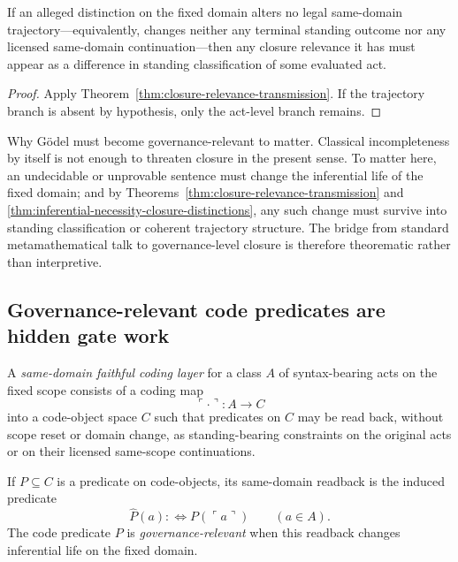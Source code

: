 \begin{corollary}
If an alleged distinction on the fixed domain alters no legal same-domain trajectory---equivalently, changes neither any terminal standing outcome nor any licensed same-domain continuation---then any closure relevance it has must appear as a difference in standing classification of some evaluated act.
\end{corollary}

\begin{proof}
Apply Theorem~\ref{thm:closure-relevance-transmission}. If the trajectory branch is absent by hypothesis, only the act-level branch remains.
\end{proof}

\begin{remark}
\label{rem:godel-governance-relevance}
Why G\"odel must become governance-relevant to matter. Classical incompleteness by itself is not enough to threaten closure in the present sense. To matter here, an undecidable or unprovable sentence must change the inferential life of the fixed domain; and by Theorems~\ref{thm:closure-relevance-transmission} and \ref{thm:inferential-necessity-closure-distinctions}, any such change must survive into standing classification or coherent trajectory structure. The bridge from standard metamathematical talk to governance-level closure is therefore theorematic rather than interpretive.
\end{remark}

\subsection{Governance-relevant code predicates are hidden gate work}

\begin{definition}
A \emph{same-domain faithful coding layer} for a class $A$ of syntax-bearing acts on the fixed scope consists of a coding map
\[
\ulcorner\cdot\urcorner : A \to C
\]
into a code-object space $C$ such that predicates on $C$ may be read back, without scope reset or domain change, as standing-bearing constraints on the original acts or on their licensed same-scope continuations.
\end{definition}

\begin{definition}
If $P\subseteq C$ is a predicate on code-objects, its same-domain readback is the induced predicate
\[
\widehat P(a) :\iff P(\ulcorner a\urcorner)
\qquad (a\in A).
\]
The code predicate $P$ is \emph{governance-relevant} when this readback changes inferential life on the fixed domain.
\end{definition}

